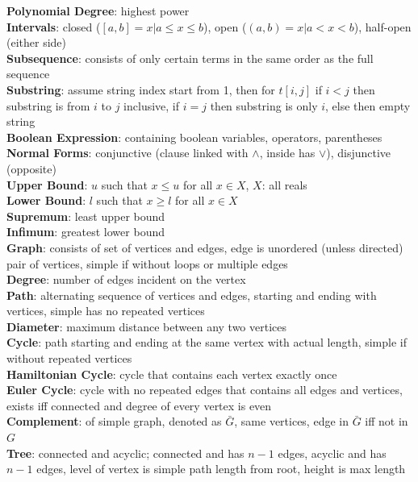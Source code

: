 \documentclass[a4paper]{article}
\begin{document}
\begin{multicols}{2}
        \textbf{Polynomial Degree}: highest power\\
        \textbf{Intervals}: closed ($[a,b] = x | a \leq x \leq b$), open ($(a,b) = x | a < x < b$), half-open (either side)\\
        \textbf{Subsequence}: consists of only certain terms in the same order as the full sequence\\
        \textbf{Substring}: assume string index start from 1, then for $t[i,j]$ if $i < j$ then substring is from $i$ to $j$ inclusive, if $i = j$ then substring is only $i$, else then empty string\\
        \textbf{Boolean Expression}: containing boolean variables, operators, parentheses\\
        \textbf{Normal Forms}: conjunctive (clause linked with $\wedge$, inside has $\vee$), disjunctive (opposite)\\
        \textbf{Upper Bound}: $u$ such that $x \leq u$ for all $x \in X$, $X$: all reals\\
        \textbf{Lower Bound}: $l$ such that $x \geq l$ for all $x \in X$\\
        \textbf{Supremum}: least upper bound\\
        \textbf{Infimum}: greatest lower bound\\
        \textbf{Graph}: consists of set of vertices and edges, edge is unordered (unless directed) pair of vertices, simple if without loops or multiple edges\\
        \textbf{Degree}: number of edges incident on the vertex\\
        \textbf{Path}: alternating sequence of vertices and edges, starting and ending with vertices, simple has no repeated vertices\\
        \textbf{Diameter}: maximum distance between any two vertices\\
        \textbf{Cycle}: path starting and ending at the same vertex with actual length, simple if without repeated vertices\\
        \textbf{Hamiltonian Cycle}: cycle that contains each vertex exactly once\\
        \textbf{Euler Cycle}: cycle with no repeated edges that contains all edges and vertices, exists iff connected and degree of every vertex is even\\
        \textbf{Complement}: of simple graph, denoted as $\bar{G}$, same vertices, edge in $\bar{G}$ iff not in $G$\\
        \textbf{Tree}: connected and acyclic; connected and has $n - 1$ edges, acyclic and has $n - 1$ edges, level of vertex is simple path length from root, height is max length\\

\end{multicols}
\end{document}
